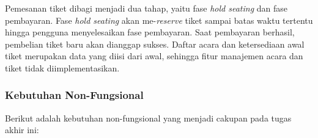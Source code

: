 Pemesanan tiket dibagi menjadi dua tahap, yaitu fase \textit{hold seating} dan fase pembayaran. Fase \textit{hold seating} akan me-\textit{reserve} tiket sampai batas waktu tertentu hingga pengguna menyelesaikan fase pembayaran. Saat pembayaran berhasil, pembelian tiket baru akan dianggap sukses. Daftar acara dan ketersediaan awal tiket merupakan data yang diisi dari awal, sehingga fitur manajemen acara dan tiket tidak diimplementasikan.


\subsubsection{Kebutuhan Non-Fungsional}

Berikut adalah kebutuhan non-fungsional yang menjadi cakupan pada tugas akhir ini:

\begingroup
\footnotesize
